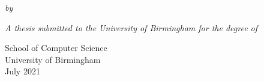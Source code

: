 \begingroup

\thispagestyle{empty}
\vspace*{\fill}\vspace*{\fill}
\setlength\parskip{\fill}
\centering\large

{\huge{}}

\emph{by}


\emph{A thesis submitted to the University of Birmingham for the degree of}\\

\raggedleft
School of Computer Science\\
University of Birmingham\\
July 2021

\vspace*{\fill}\vspace*{\fill}

\par\endgroup
